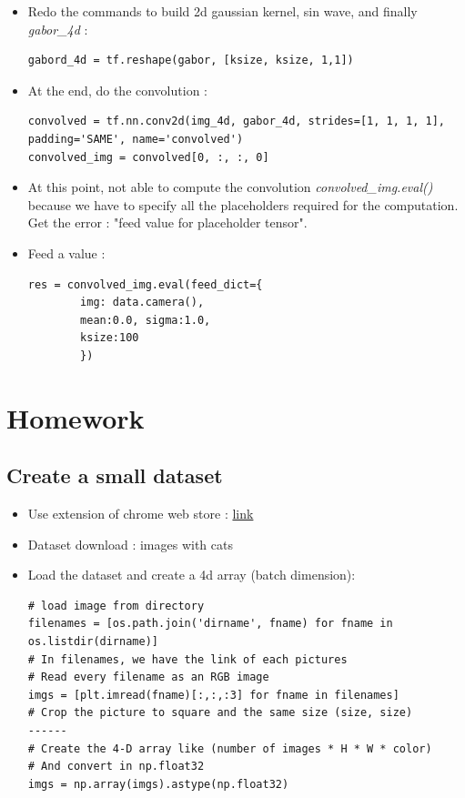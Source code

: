 \documentclass[12pt,a4paper]{article}
\begin{document}
\begin{itemize}
\begin{lstlisting}
\end{lstlisting}
\item Redo the commands to build 2d gaussian kernel, sin wave, and finally \textit{gabor\_4d} :
\begin{lstlisting}
gabord_4d = tf.reshape(gabor, [ksize, ksize, 1,1])
\end{lstlisting}
\item At the end, do the convolution :
\begin{lstlisting}
convolved = tf.nn.conv2d(img_4d, gabor_4d, strides=[1, 1, 1, 1], padding='SAME', name='convolved')
convolved_img = convolved[0, :, :, 0]
\end{lstlisting}
\item At this point, not able to compute the convolution \textit{convolved\_img.eval()} because we have to specify all the placeholders required for the computation.\\
Get the error : "feed value for placeholder tensor".
\item Feed a value :
\begin{lstlisting}
res = convolved_img.eval(feed_dict={
		img: data.camera(), 
		mean:0.0, sigma:1.0, 
		ksize:100
		})
\end{lstlisting}
\end{itemize}

\section{Homework}
\subsection{Create a small dataset}
\begin{itemize}
\item Use extension of chrome web store : \href{https://chrome.google.com/webstore/detail/download-all-images/ifipmflagepipjokmbdecpmjbibjnakm?hl=en}{link}
\item Dataset download : images with cats
\item Load the dataset and create a 4d array (batch dimension):
\begin{lstlisting}
# load image from directory
filenames = [os.path.join('dirname', fname) for fname in os.listdir(dirname)]
# In filenames, we have the link of each pictures
# Read every filename as an RGB image
imgs = [plt.imread(fname)[:,:,:3] for fname in filenames]
# Crop the picture to square and the same size (size, size)
------
# Create the 4-D array like (number of images * H * W * color)
# And convert in np.float32
imgs = np.array(imgs).astype(np.float32)
\end{lstlisting}

\end{itemize}
\end{document}
